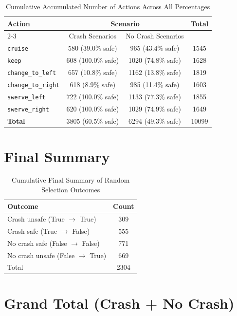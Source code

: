 \documentclass{article}
\begin{document}
\begin{table}[h]
\centering
\caption{Cumulative Accumulated Number of Actions Across All Percentages}
\begin{tabular}{l|cc|c}
\toprule
\multirow{2}{*}{Action} & \multicolumn{2}{c|}{Scenario} & \multirow{2}{*}{Total} \\
\cmidrule{2-3}
 & Crash Scenarios & No Crash Scenarios \\
\midrule
\texttt{cruise} & 580 (39.0\% safe) & 965 (43.4\% safe) & 1545 \\ 
\texttt{keep} & 608 (100.0\% safe) & 1020 (74.8\% safe) & 1628 \\ 
\texttt{change\_to\_left} & 657 (10.8\% safe) & 1162 (13.8\% safe) & 1819 \\ 
\texttt{change\_to\_right} & 618 (8.9\% safe) & 985 (11.4\% safe) & 1603 \\ 
\texttt{swerve\_left} & 722 (100.0\% safe) & 1133 (77.3\% safe) & 1855 \\ 
\texttt{swerve\_right} & 620 (100.0\% safe) & 1029 (74.9\% safe) & 1649 \\ 
\midrule
\textbf{Total} & 3805 (60.5\% safe) & 6294 (49.3\% safe) & 10099 \\ 
\bottomrule
\end{tabular}
\end{table}

\section{Final Summary}

\begin{table}[h]
\centering
\caption{Cumulative Final Summary of Random Selection Outcomes}
\begin{tabular}{lc}
\toprule
Outcome & Count \\
\midrule
Crash unsafe (True $\rightarrow$ True) & 309 \\ 
Crash safe (True $\rightarrow$ False) & 555 \\ 
No crash safe (False $\rightarrow$ False) & 771 \\ 
No crash unsafe (False $\rightarrow$ True) & 669 \\ 
\midrule
Total & 2304 \\ 
\bottomrule
\end{tabular}
\end{table}

\section{Grand Total (Crash + No Crash)}
\end{document}
